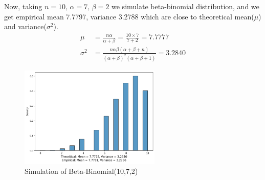 \begin{example}
    Now, taking $ n=10,\,\alpha=7,\,\beta=2 $ we simulate beta-binomial distribution, and we get empirical mean 7.7797, variance 3.2788 which are close to theoretical mean($ \mu $) and variance($ \sigma^2 $).
    \begin{align*}
        \mu &= \frac{n \alpha}{\alpha+\beta} = \frac{10 \times 7 }{ 7 + 2} = 7.7777 \\
        \sigma^2 &= \frac{n \alpha \beta(\alpha+\beta+n)}{(\alpha+\beta)^2(\alpha+\beta+1)} = 3.2840
    \end{align*}
    
    \begin{figure}[H]
        \centering
        \includegraphics[width=0.6\textwidth]{images/gibbs/example2/ex2-beta-binomial.png}
        \caption{Simulation of Beta-Binomial(10,7,2)}
        \label{fig:beta-binomial simulation}
    \end{figure}

\end{example}

